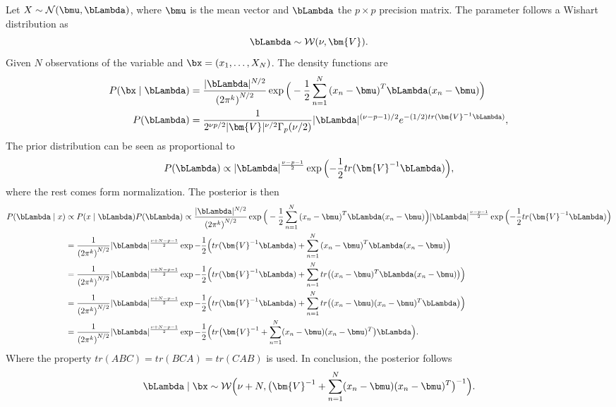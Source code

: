 Let \(X \sim \mathcal{N}(\bmu, \bLambda)\), where \(\bmu\) is the mean vector and \(\bLambda\) the \(p \times p\)  precision matrix. The parameter follows a Wishart distribution as
\[
  \bLambda \sim \mathcal{W}(\nu, \bm{V}).
\]
Given \(N\) observations of the variable and \(\bx =(x_{1},\dots, X_{N})\). The density functions are
\[
  \begin{aligned}
    P(\bx \mid \bLambda) &= \frac{|\bLambda|^{N/2}}{{(2\pi^{k})}^{N/2}}\exp \Big( -\frac{1}{2}\sum_{n=1}^{N}{(x_{n} - \bmu)}^{T}\bLambda(x_{n} - \bmu) \Big)\\
    P(\bLambda) &= \frac{1}{2^{\nu p/2} |\bm{V}|^{\nu/2} \Gamma_{p}(\nu/2)}|\bLambda|^{(\nu-p-1)/2}e^{-(1/2)tr(\bm{V}^{-1}\bLambda)},
  \end{aligned}
\]
The prior distribution can be seen as proportional to
\[
  P(\bLambda) \propto |\bLambda|^{\frac{\nu-p-1}{2}} \exp \Big({-\frac{1}{2}tr(\bm{V}^{-1}\bLambda)}\Big),
\]
where the rest comes form normalization.
The posterior is then
\[
  \begin{aligned}
    P(\bLambda \mid x) &\propto P(x \mid \bLambda)P(\bLambda) \propto   \frac{|\bLambda|^{N/2}}{{(2\pi^{k})}^{N/2}}\exp \Big( -\frac{1}{2}\sum_{n=1}^{N}{(x_{n} - \bmu)}^{T}\bLambda(x_{n} - \bmu) \Big) |\bLambda|^{\frac{\nu-p-1}{2}} \exp \Big({-\frac{1}{2}tr(\bm{V}^{-1}\bLambda)}\Big)\\
    &= \frac{1}{ {(2\pi^{k})}^{N/2}}|\bLambda|^{\frac{\nu+N-p-1}{2}} \exp -\frac{1}{2}\Big( tr(\bm{V}^{-1}\bLambda) + \sum_{n=1}^{N}{(x_{n} - \bmu)}^{T}\bLambda(x_{n} - \bmu) \Big)\\
    &= \frac{1}{ {(2\pi^{k})}^{N/2}}|\bLambda|^{\frac{\nu+N-p-1}{2}} \exp -\frac{1}{2}\Big( tr(\bm{V}^{-1}\bLambda) + \sum_{n=1}^{N}tr\big((x_{n} - \bmu)^{T}\bLambda(x_{n} - \bmu)\big) \Big)\\
    &= \frac{1}{ {(2\pi^{k})}^{N/2}}|\bLambda|^{\frac{\nu+N-p-1}{2}} \exp -\frac{1}{2}\Big( tr(\bm{V}^{-1}\bLambda) + \sum_{n=1}^{N}tr \big( (x_{n} - \bmu)(x_{n} - \bmu)^{T}\bLambda\big) \Big)\\
    &= \frac{1}{ {(2\pi^{k})}^{N/2}}|\bLambda|^{\frac{\nu+N-p-1}{2}} \exp -\frac{1}{2}\Big( tr \big( \bm{V}^{-1} +  \sum_{n=1}^{N}(x_{n} - \bmu)(x_{n} - \bmu)^{T}\big)\bLambda \Big).
  \end{aligned}
\]
Where the property \(tr(ABC) = tr(BCA) = tr(CAB)\) is used. In conclusion, the posterior follows
\[
  \bLambda \mid \bx \sim \mathcal{W}\Big(\nu + N, \big(\bm{V}^{-1} +  \sum_{n=1}^{N}(x_{n} - \bmu)(x_{n} - \bmu)^{T}\big)^{-1}  \Big).
\]

